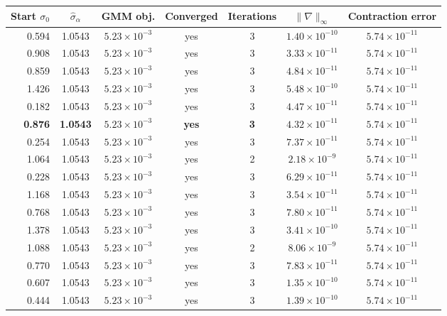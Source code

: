\begin{tabular}{rcccccc}
\toprule
Start $\sigma_0$ & $\hat\sigma_\alpha$ & GMM obj. & Converged & Iterations & $\|\nabla\|_\infty$ & Contraction error \\
\midrule
0.594 & 1.0543 & $5.23\times10^{-3}$ & yes & 3 & $1.40\times10^{-10}$ & $5.74\times10^{-11}$ \\
0.908 & 1.0543 & $5.23\times10^{-3}$ & yes & 3 & $3.33\times10^{-11}$ & $5.74\times10^{-11}$ \\
0.859 & 1.0543 & $5.23\times10^{-3}$ & yes & 3 & $4.84\times10^{-11}$ & $5.74\times10^{-11}$ \\
1.426 & 1.0543 & $5.23\times10^{-3}$ & yes & 3 & $5.48\times10^{-10}$ & $5.74\times10^{-11}$ \\
0.182 & 1.0543 & $5.23\times10^{-3}$ & yes & 3 & $4.47\times10^{-11}$ & $5.74\times10^{-11}$ \\
\textbf{0.876} & \textbf{1.0543} & \textbf{$5.23\times10^{-3}$} & \textbf{yes} & \textbf{3} & \textbf{$4.32\times10^{-11}$} & \textbf{$5.74\times10^{-11}$} \\
0.254 & 1.0543 & $5.23\times10^{-3}$ & yes & 3 & $7.37\times10^{-11}$ & $5.74\times10^{-11}$ \\
1.064 & 1.0543 & $5.23\times10^{-3}$ & yes & 2 & $2.18\times10^{-9}$ & $5.74\times10^{-11}$ \\
0.228 & 1.0543 & $5.23\times10^{-3}$ & yes & 3 & $6.29\times10^{-11}$ & $5.74\times10^{-11}$ \\
1.168 & 1.0543 & $5.23\times10^{-3}$ & yes & 3 & $3.54\times10^{-11}$ & $5.74\times10^{-11}$ \\
0.768 & 1.0543 & $5.23\times10^{-3}$ & yes & 3 & $7.80\times10^{-11}$ & $5.74\times10^{-11}$ \\
1.378 & 1.0543 & $5.23\times10^{-3}$ & yes & 3 & $3.41\times10^{-10}$ & $5.74\times10^{-11}$ \\
1.088 & 1.0543 & $5.23\times10^{-3}$ & yes & 2 & $8.06\times10^{-9}$ & $5.74\times10^{-11}$ \\
0.770 & 1.0543 & $5.23\times10^{-3}$ & yes & 3 & $7.83\times10^{-11}$ & $5.74\times10^{-11}$ \\
0.607 & 1.0543 & $5.23\times10^{-3}$ & yes & 3 & $1.35\times10^{-10}$ & $5.74\times10^{-11}$ \\
0.444 & 1.0543 & $5.23\times10^{-3}$ & yes & 3 & $1.39\times10^{-10}$ & $5.74\times10^{-11}$ \\
\bottomrule
\end{tabular}
